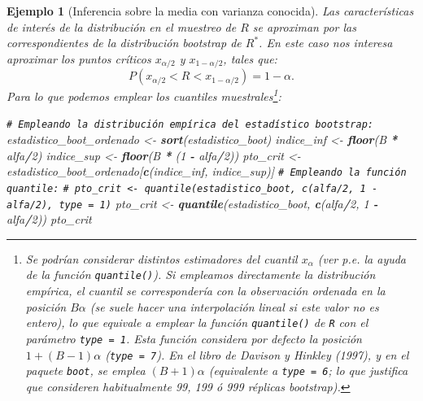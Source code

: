 \documentclass[
]{book}
\newenvironment{Shaded}{\begin{snugshade}}{\end{snugshade}}
\newcommand{\CommentTok}[1]{\textcolor[rgb]{0.56,0.35,0.01}{\textit{#1}}}
\newcommand{\DecValTok}[1]{\textcolor[rgb]{0.00,0.00,0.81}{#1}}
\newcommand{\FunctionTok}[1]{\textcolor[rgb]{0.13,0.29,0.53}{\textbf{#1}}}
\newcommand{\NormalTok}[1]{#1}
\newcommand{\OtherTok}[1]{\textcolor[rgb]{0.56,0.35,0.01}{#1}}
\newcommand{\SpecialCharTok}[1]{\textcolor[rgb]{0.81,0.36,0.00}{\textbf{#1}}}
\theoremstyle{break}
\newtheorem{example}{Ejemplo}[chapter]
\theoremstyle{nonumberplain}
\renewcommand{\CommentTok}[1]{\textcolor[rgb]{0.41,0.41,0.41}{\texttt{#1}}}
\let\oldfootnote\footnote
\renewcommand\footnote[1]{\oldfootnote{\hspace{2mm}#1}}
\begin{document}
\begin{example}[Inferencia sobre la media con varianza conocida]
Las características de interés de la distribución en el muestreo de \(R\)
se aproximan por las correspondientes de la distribución bootstrap de \(R^{\ast}\).
En este caso nos interesa aproximar los puntos críticos \(x_{\alpha /2}\) y
\(x_{1-\alpha /2}\), tales que:
\[P\left( x_{\alpha /2} < R < x_{1-\alpha /2} \right) = 1-\alpha.\]
Para lo que podemos emplear los cuantiles muestrales\footnote{
  Se podrían considerar distintos estimadores del cuantil \(x_{\alpha}\)
  (ver p.e. la ayuda de la función \texttt{quantile()}).
  Si empleamos directamente la distribución empírica, el cuantil se
  correspondería con la observación ordenada en la posición \(B \alpha\)
  (se suele hacer una interpolación lineal si este valor no es entero),
  lo que equivale a emplear la función \texttt{quantile()} de \texttt{R} con el parámetro
  \texttt{type\ =\ 1}. Esta función considera por defecto la posición
  \(1 + (B - 1) \alpha\) (\texttt{type\ =\ 7}).
  En el libro de Davison y Hinkley (1997), y en el paquete \texttt{boot}, se emplea \((B + 1) \alpha\) (equivalente a \texttt{type\ =\ 6}; lo que justifica que
  consideren habitualmente 99, 199 ó 999 réplicas bootstrap).}:

\begin{Shaded}
\begin{Highlighting}[]
\CommentTok{\# Empleando la distribución empírica del estadístico bootstrap: }
\NormalTok{estadistico\_boot\_ordenado }\OtherTok{\textless{}{-}} \FunctionTok{sort}\NormalTok{(estadistico\_boot)}
\NormalTok{indice\_inf }\OtherTok{\textless{}{-}} \FunctionTok{floor}\NormalTok{(B }\SpecialCharTok{*}\NormalTok{ alfa}\SpecialCharTok{/}\DecValTok{2}\NormalTok{)}
\NormalTok{indice\_sup }\OtherTok{\textless{}{-}} \FunctionTok{floor}\NormalTok{(B }\SpecialCharTok{*}\NormalTok{ (}\DecValTok{1} \SpecialCharTok{{-}}\NormalTok{ alfa}\SpecialCharTok{/}\DecValTok{2}\NormalTok{))}
\NormalTok{pto\_crit }\OtherTok{\textless{}{-}}\NormalTok{ estadistico\_boot\_ordenado[}\FunctionTok{c}\NormalTok{(indice\_inf, indice\_sup)]}
\CommentTok{\# Empleando la función \textasciigrave{}quantile\textasciigrave{}:}
\CommentTok{\# pto\_crit \textless{}{-} quantile(estadistico\_boot, c(alfa/2, 1 {-} alfa/2), type = 1)}
\NormalTok{pto\_crit }\OtherTok{\textless{}{-}} \FunctionTok{quantile}\NormalTok{(estadistico\_boot, }\FunctionTok{c}\NormalTok{(alfa}\SpecialCharTok{/}\DecValTok{2}\NormalTok{, }\DecValTok{1} \SpecialCharTok{{-}}\NormalTok{ alfa}\SpecialCharTok{/}\DecValTok{2}\NormalTok{))}
\NormalTok{pto\_crit}
\end{Highlighting}
\end{Shaded}


\end{example}
\end{document}
